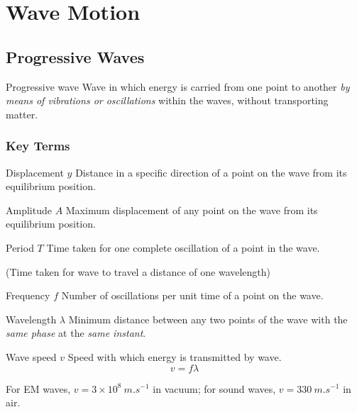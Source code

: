 \section{Wave Motion}
\subsection{Progressive Waves}
\begin{defn}{Progressive wave}{}
Wave in which energy is carried from one point to another \emph{by means of vibrations or oscillations} within the waves, without transporting matter.
\end{defn}

\subsubsection{Key Terms}
\begin{defn}{Displacement $y$}{}
Distance in a specific direction of a point on the wave from its equilibrium position.
\end{defn}

\begin{defn}{Amplitude $A$}{}
Maximum displacement of any point on the wave from its equilibrium position. 
\end{defn}

\begin{defn}{Period $T$}{}
Time taken for one complete oscillation of a point in the wave.

(Time taken for wave to travel a distance of one wavelength)
\end{defn}

\begin{defn}{Frequency $f$}{}
Number of oscillations per unit time of a point on the wave.
\end{defn}

\begin{defn}{Wavelength $\lambda$}{}
Minimum distance between any two points of the wave with the \emph{same phase} at the \emph{same instant}.
\end{defn}

\begin{defn}{Wave speed $v$}{}
Speed with which energy is transmitted by wave.
\begin{equation}
v=f\lambda
\end{equation}
\end{defn}

\begin{remark}
For EM waves, $v=3\times10^8\:\unit{m.s^{-1}}$ in vacuum; for sound waves, $v=330\:\unit{m.s^{-1}}$ in air.
\end{remark}

